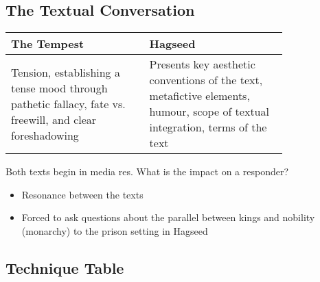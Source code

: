 	\subsection{The Textual Conversation}

		\def\arraystretch{1.5}
		\begin{table}[htbp]
			\centering
			\begin{tabular}{ p{0.4\linewidth} |p{0.4\linewidth} }
				The Tempest & Hagseed \\ \hline
				Tension, establishing a tense mood through pathetic fallacy, fate vs. freewill, and clear foreshadowing & Presents key aesthetic conventions of the text, metafictive elements, humour, scope of textual integration, terms of the text
			\end{tabular}
		\end{table}

		Both texts begin in media res. What is the impact on a responder?
		\begin{itemize}
			\item Resonance between the texts
			\item Forced to ask questions about the parallel between kings and nobility (monarchy) to the prison setting in Hagseed
		\end{itemize}

	\subsection{Technique Table}
	
